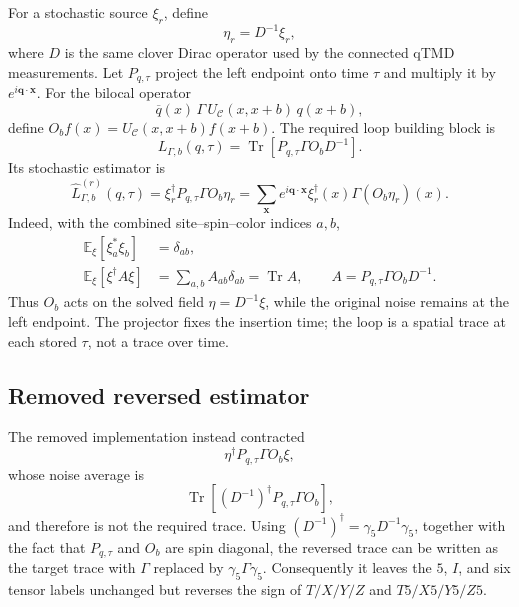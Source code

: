 \documentclass[11pt,a4paper]{article}
\begin{document}
For a stochastic source \(\xi_r\), define
\begin{equation}
  \eta_r = D^{-1}\xi_r,
\end{equation}
where \(D\) is the same clover Dirac operator used by the connected qTMD
measurements.  Let \(P_{q,\tau}\) project the left endpoint onto time \(\tau\)
and multiply it by \(e^{i\mathbf q\cdot\mathbf x}\).  For the bilocal operator
\begin{equation}
  \overline q(x)\,\Gamma\,
  U_{\mathcal C}(x,x+b)\,q(x+b),
\end{equation}
define \(O_b f(x)=U_{\mathcal C}(x,x+b)f(x+b)\).  The required loop building
block is
\begin{equation}
  L_{\Gamma,b}(q,\tau)
  =
  \operatorname{Tr}\!\left[
    P_{q,\tau}\Gamma O_bD^{-1}
  \right].
\end{equation}
Its stochastic estimator is
\begin{equation}
  \widehat L_{\Gamma,b}^{(r)}(q,\tau)
  =
  \xi_r^\dagger P_{q,\tau}\Gamma O_b\eta_r
  =
  \sum_{\mathbf x}e^{i\mathbf q\cdot\mathbf x}
  \xi_r^\dagger(x)\Gamma (O_b\eta_r)(x).
\end{equation}
Indeed, with the combined site--spin--color indices \(a,b\),
\begin{align}
  \mathbb E_\xi\!\left[\xi_a^\ast\xi_b\right]&=\delta_{ab},\\
  \mathbb E_\xi\!\left[\xi^\dagger A\xi\right]
  &=\sum_{a,b}A_{ab}\delta_{ab}=\operatorname{Tr}A,
  \qquad
  A=P_{q,\tau}\Gamma O_bD^{-1}.
\end{align}
Thus \(O_b\) acts on the solved field \(\eta=D^{-1}\xi\), while the original
noise remains at the left endpoint.  The projector fixes the insertion time;
the loop is a spatial trace at each stored \(\tau\), not a trace over time.

\subsection{Removed reversed estimator}

The removed implementation instead contracted
\begin{equation}
  \eta^\dagger P_{q,\tau}\Gamma O_b\xi,
\end{equation}
whose noise average is
\begin{equation}
  \operatorname{Tr}\!\left[
    (D^{-1})^\dagger P_{q,\tau}\Gamma O_b
  \right],
\end{equation}
and therefore is not the required trace.  Using
\((D^{-1})^\dagger=\gamma_5D^{-1}\gamma_5\), together with the fact that
\(P_{q,\tau}\) and \(O_b\) are spin diagonal, the reversed trace can be written
as the target trace with \(\Gamma\) replaced by \(\gamma_5\Gamma\gamma_5\).
Consequently it leaves the \(5\), \(I\), and six tensor labels unchanged but
reverses the sign of \(T/X/Y/Z\) and \(T5/X5/Y5/Z5\).
\end{document}
